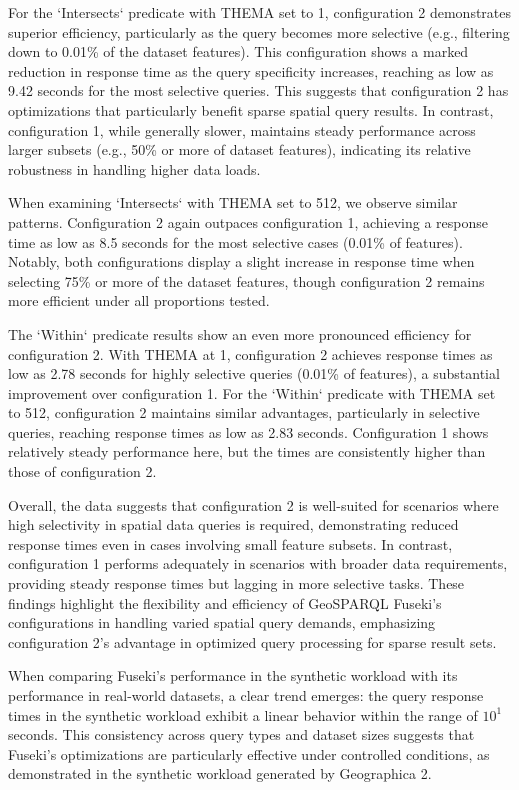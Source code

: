 For the `Intersects` predicate with THEMA set to 1, configuration 2 demonstrates superior efficiency, particularly as the query becomes more selective (e.g., filtering down to 0.01\% of the dataset features). This configuration shows a marked reduction in response time as the query specificity increases, reaching as low as 9.42 seconds for the most selective queries. This suggests that configuration 2 has optimizations that particularly benefit sparse spatial query results. In contrast, configuration 1, while generally slower, maintains steady performance across larger subsets (e.g., 50\% or more of dataset features), indicating its relative robustness in handling higher data loads.

When examining `Intersects` with THEMA set to 512, we observe similar patterns. Configuration 2 again outpaces configuration 1, achieving a response time as low as 8.5 seconds for the most selective cases (0.01\% of features). Notably, both configurations display a slight increase in response time when selecting 75\% or more of the dataset features, though configuration 2 remains more efficient under all proportions tested.

The `Within` predicate results show an even more pronounced efficiency for configuration 2. With THEMA at 1, configuration 2 achieves response times as low as 2.78 seconds for highly selective queries (0.01\% of features), a substantial improvement over configuration 1. For the `Within` predicate with THEMA set to 512, configuration 2 maintains similar advantages, particularly in selective queries, reaching response times as low as 2.83 seconds. Configuration 1 shows relatively steady performance here, but the times are consistently higher than those of configuration 2.

Overall, the data suggests that configuration 2 is well-suited for scenarios where high selectivity in spatial data queries is required, demonstrating reduced response times even in cases involving small feature subsets. In contrast, configuration 1 performs adequately in scenarios with broader data requirements, providing steady response times but lagging in more selective tasks. These findings highlight the flexibility and efficiency of GeoSPARQL Fuseki’s configurations in handling varied spatial query demands, emphasizing configuration 2’s advantage in optimized query processing for sparse result sets.

When comparing Fuseki's performance in the synthetic workload with its performance in real-world datasets, a clear trend emerges: the query response times in the synthetic workload exhibit a linear behavior within the range of $10^1$ seconds. This consistency across query types and dataset sizes suggests that Fuseki's optimizations are particularly effective under controlled conditions, as demonstrated in the synthetic workload generated by Geographica 2. 

